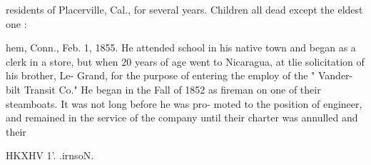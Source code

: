 \documentclass[oneside]{book}
\begin{document}
residents of Placerville, Cal., for several years. Children all 
dead except the eldest one : 







hem, Conn., Feb. 1, 1855. He attended school in his native 
town and began as a clerk in a store, but when 20 years of 
age went to Nicaragua, at tlie solicitation of his brother, Le- 
Grand, for the purpose of entering the employ of the " Vander- 
bilt Transit Co." He began in the Fall of 1852 as fireman on 
one of their steamboats. It was not long before he was pro- 
moted to the position of engineer, and remained in the service 
of the company until their charter was annulled and their 




HKXHV 1'. .irnsoN. 
\end{document}
